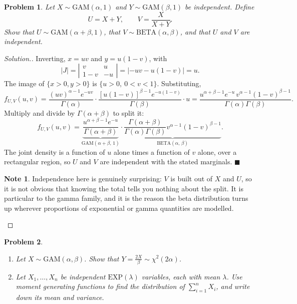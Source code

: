 \documentclass[12pt,a4paper]{report}
\theoremstyle{definition}
\newtheorem{note}[thm]{Note}
\theoremstyle{plain}
\newtheorem{problemx}{Problem}[section]
\newenvironment{problem}{\begin{problemx}}{\end{problemx}}
\newenvironment{solution}
  {\renewcommand{\qedsymbol}{}\begin{proof}[\textit{Solution}.]}
  {\end{proof}}
\begin{document}
\begin{problem}
Let $X\sim\text{GAM}(\alpha,1)$ and $Y\sim\text{GAM}(\beta,1)$ be independent.
Define
\[U=X+Y,\qquad V=\frac{X}{X+Y}.\]
Show that $U\sim\text{GAM}(\alpha+\beta,1)$, that $V\sim\text{BETA}
(\alpha,\beta)$, and that $U$ and $V$ are independent.
\end{problem}

\begin{solution}
Inverting, $x=uv$ and $y=u(1-v)$, with
\[|J|=\left|\begin{matrix}v & u\\ 1-v & -u\end{matrix}\right|
=\left|-uv-u(1-v)\right|=u.\]
The image of $\{x>0,y>0\}$ is $\{u>0,\ 0<v<1\}$. Substituting,
\[f_{U,V}(u,v)=\frac{(uv)^{\alpha-1}e^{-uv}}{\Gamma(\alpha)}\cdot
\frac{\left[u(1-v)\right]^{\beta-1}e^{-u(1-v)}}{\Gamma(\beta)}\cdot u
=\frac{u^{\alpha+\beta-1}e^{-u}\,v^{\alpha-1}(1-v)^{\beta-1}}
{\Gamma(\alpha)\Gamma(\beta)}.\]
Multiply and divide by $\Gamma(\alpha+\beta)$ to split it:
\[f_{U,V}(u,v)=
\underbrace{\frac{u^{\alpha+\beta-1}e^{-u}}{\Gamma(\alpha+\beta)}}
_{\text{GAM}(\alpha+\beta,\,1)}\cdot
\underbrace{\frac{\Gamma(\alpha+\beta)}{\Gamma(\alpha)\Gamma(\beta)}
v^{\alpha-1}(1-v)^{\beta-1}}_{\text{BETA}(\alpha,\,\beta)}.\]
The joint density is a function of $u$ alone times a function of $v$ alone, over a
rectangular region, so $U$ and $V$ are independent with the stated marginals.
$\blacksquare$

\begin{note}
Independence here is genuinely surprising: $V$ is built out of $X$ and $U$, so it
is not obvious that knowing the total tells you nothing about the split. It is
particular to the gamma family, and it is the reason the beta distribution turns
up wherever proportions of exponential or gamma quantities are modelled.
\end{note}
\end{solution}

\begin{problem}
\begin{enumerate}
\item[(a).] Let $X\sim\text{GAM}(\alpha,\beta)$. Show that
$Y=\frac{2X}{\beta}\sim\chi^2(2\alpha)$.
\item[(b).] Let $X_1,\ldots,X_n$ be independent $\text{EXP}(\lambda)$ variables,
each with mean $\lambda$. Use moment generating functions to find the distribution
of $\sum_{i=1}^nX_i$, and write down its mean and variance.
\end{enumerate}
\end{problem}
\end{document}
